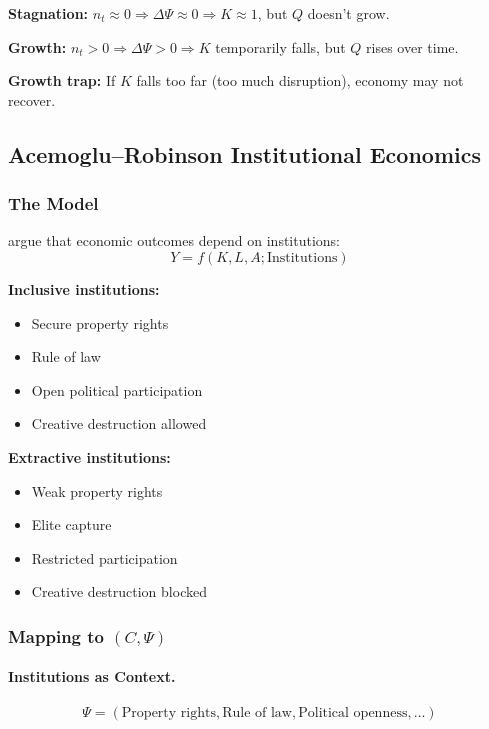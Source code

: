 \textbf{Stagnation:} $n_t \approx 0 \Rightarrow \Delta \Psi \approx 0 \Rightarrow K \approx 1$, but $Q$ doesn't grow.

\textbf{Growth:} $n_t > 0 \Rightarrow \Delta \Psi > 0 \Rightarrow K$ temporarily falls, but $Q$ rises over time.

\textbf{Growth trap:} If $K$ falls too far (too much disruption), economy may not recover.

\subsection{Acemoglu--Robinson Institutional Economics}
\label{app:acemoglurobbinson}

\subsubsection{The Model}

\citet{acemoglu} argue that economic outcomes depend on institutions:
\begin{equation}
  Y = f(K, L, A; \text{Institutions})
\end{equation}

\textbf{Inclusive institutions:}
\begin{itemize}
  \item Secure property rights
  \item Rule of law
  \item Open political participation
  \item Creative destruction allowed
\end{itemize}

\textbf{Extractive institutions:}
\begin{itemize}
  \item Weak property rights
  \item Elite capture
  \item Restricted participation
  \item Creative destruction blocked
\end{itemize}

\subsubsection{Mapping to $(C, \Psi)$}

\paragraph{Institutions as Context.}
\begin{equation}
  \Psi = (\text{Property rights}, \text{Rule of law}, \text{Political openness}, \ldots)
\end{equation}


